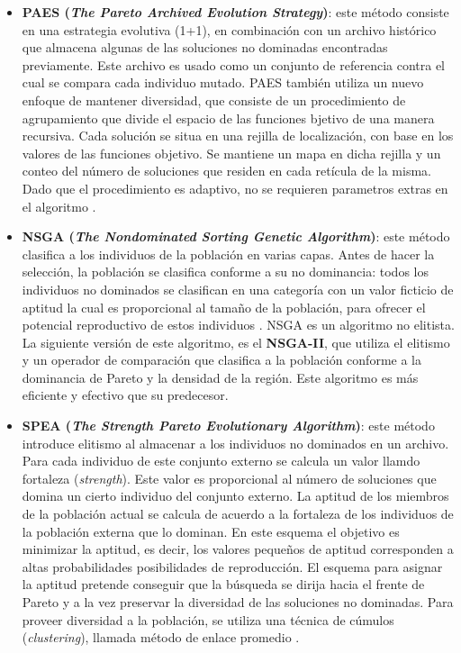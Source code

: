 \begin{itemize}
   \begin{itemize}
    \item \textbf{PAES (\textit{The Pareto Archived Evolution Strategy})}: este m\'etodo consiste en una estrategia evolutiva (1+1),
    en combinaci\'on con un archivo hist\'orico que almacena algunas de las soluciones no dominadas encontradas previamente. Este
    archivo es usado como un conjunto de referencia contra el cual se compara cada individuo mutado. PAES tambi\'en utiliza un nuevo 
    enfoque de mantener diversidad, que consiste de un procedimiento de agrupamiento que divide el espacio de las funciones bjetivo 
    de una manera recursiva. Cada soluci\'on se situa en una rejilla de localizaci\'on, con base en los valores de las funciones
    objetivo. Se mantiene un mapa en dicha rejilla y un conteo del n\'umero de soluciones que residen en cada ret\'icula de la misma.
    Dado que el procedimiento es adaptivo, no se requieren parametros extras en el algoritmo \cite{paes99}.
    
    \item \textbf{NSGA (\textit{The Nondominated Sorting Genetic Algorithm})}: este m\'etodo clasifica a los 
    individuos de la poblaci\'on en varias capas. Antes de hacer la selecci\'on, la poblaci\'on se clasifica conforme a 
    su no dominancia: todos los individuos no dominados se clasifican en una categor\'ia con un valor ficticio de 
    aptitud la cual es proporcional al tama\~no de la poblaci\'on, para ofrecer el potencial reproductivo de estos 
    individuos \cite{Srinivas94}. NSGA es un algoritmo no elitista. La siguiente versi\'on de este algoritmo, es el \textbf{NSGA-II}, 
    que utiliza el elitismo y un operador de comparaci\'on que clasifica a la poblaci\'on conforme a la dominancia de Pareto y 
    la densidad de la regi\'on. Este algoritmo es m\'as eficiente y efectivo que su predecesor.
    
    \item \textbf{SPEA (\textit{The Strength Pareto Evolutionary Algorithm})}: este m\'etodo introduce elitismo al almacenar a los
    individuos no dominados en un archivo. Para cada individuo de este conjunto externo se calcula un valor llamdo fortaleza 
    (\textit{strength}). Este valor es proporcional al n\'umero de soluciones que domina un cierto individuo del conjunto externo.
    La aptitud de los miembros de la poblaci\'on actual se calcula de acuerdo a la fortaleza de los individuos de la poblaci\'on
    externa que lo dominan. En este esquema el objetivo es minimizar la aptitud, es decir, los valores peque\~nos de aptitud corresponden 
    a altas probabilidades posibilidades de reproducci\'on. El esquema para asignar la aptitud pretende conseguir que la b\'usqueda 
    se dirija hacia el frente de Pareto y a la vez preservar la diversidad de las soluciones no dominadas. Para proveer 
    diversidad a la poblaci\'on, se utiliza una t\'ecnica de c\'umulos (\textit{clustering}), llamada m\'etodo de enlace 
    promedio \cite{Zitzler99}. 
    

\end{itemize}
\end{itemize}
